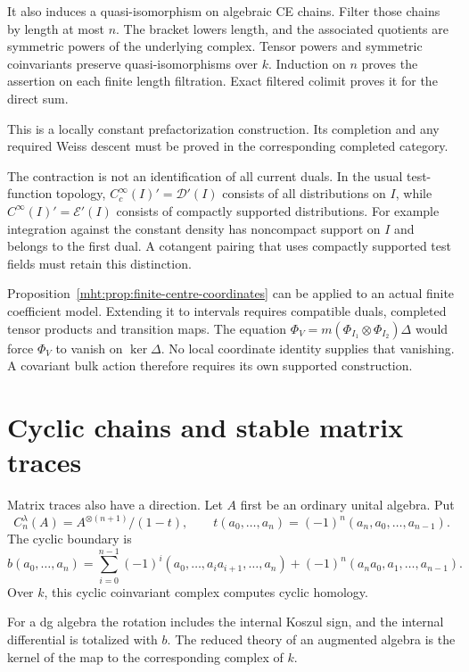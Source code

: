 It also induces a quasi-isomorphism on algebraic CE chains.
Filter those chains by length at most $n$. The bracket lowers
length, and the associated quotients are symmetric powers of
the underlying complex. Tensor powers and symmetric
coinvariants preserve quasi-isomorphisms over $k$. Induction
on $n$ proves the assertion on each finite length filtration. Exact filtered colimit proves it for the direct sum. 

This is
a locally constant prefactorization construction. Its
completion and any required Weiss descent must be proved in
the corresponding completed category.

The contraction is not an identification of all current
duals. In the usual test-function topology,
$C_c^\infty(I)'=\mathcal D'(I)$ consists of all distributions
on $I$, while $C^\infty(I)'=\mathcal E'(I)$ consists of
compactly supported distributions. For example integration
against the constant density has noncompact support on $I$
and belongs to the first dual. A cotangent pairing that uses
compactly supported test fields must retain this distinction.

Proposition~\ref{mht:prop:finite-centre-coordinates} can be
applied to an actual finite coefficient model. Extending it
to intervals requires compatible duals, completed tensor
products and transition maps. The equation
$\Phi_V=m(\Phi_{I_1}\otimes\Phi_{I_2})\Delta$ would force
$\Phi_V$ to vanish on $\ker\Delta$. No local coordinate
identity supplies that vanishing. A covariant bulk action
therefore requires its own supported construction.

\section{Cyclic chains and stable matrix traces}

Matrix traces also have a direction. Let $A$ first be an ordinary
unital algebra. Put
\[
 C^\lambda_n(A)=A^{\otimes(n+1)}/(1-t),\qquad
 t(a_0,\ldots,a_n)=(-1)^n(a_n,a_0,\ldots,a_{n-1}).
\]
The cyclic boundary is
\[
 b(a_0,\ldots,a_n)
 =\sum_{i=0}^{n-1}(-1)^i
    (a_0,\ldots,a_ia_{i+1},\ldots,a_n)
   +(-1)^n(a_na_0,a_1,\ldots,a_{n-1}).
\]
Over $k$, this cyclic coinvariant complex computes cyclic
homology. 

For a dg algebra the rotation includes the internal
Koszul sign, and the internal differential is totalized with $b$.
The reduced theory of an augmented algebra is the kernel of the
map to the corresponding complex of $k$.

